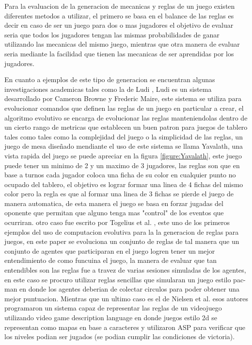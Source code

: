 Para la evaluacion de la generacion de mecanicas y reglas de un juego existen
diferentes metodos a utilizar, el primero se basa en el balance de las reglas es
decir en caso de ser un juego para dos o mas jugadores el objetivo de evaluar
seria que todos los jugadores tengan las mismas probabilidades de ganar
utilizando las mecanicas del mismo juego, mientras que otra manera de evaluar
seria mediante la facilidad que tienen las mecanicas de ser aprendidas por los
jugadores.

En cuanto a ejemplos de este tipo de generacion se encuentran algunas
investigaciones academicas tales como la de Ludi \cite{Browne2010}, Ludi es un
sistema desarrollado por Cameron Browne y Frederic Maire, este sistema se
utiliza para evolucionar comandos que definen las reglas de un juego en
particular a crear, el algoritmo evolutivo se encarga de evolucionar las reglas
manteniendolas dentro de un cierto rango de metricas que establecen un buen
patron para juegos de tablero tales como tales como la complejidad del juego o
la simplicidad de las reglas, un juego de mesa diseñado mendiante el uso de este
sistema se llama Yavalath, una vista rapida del juego se puede apreciar en la
figura \ref{figure:Yavalath}, este juego puede tener un minimo de 2 y un maximo
de 3 jugadores, las reglas son que en base a turnos cada jugador coloca una
ficha de su color en cualquier punto no ocupado del tablero, el objetivo es
lograr formar una linea de 4 fichas del mismo color pero la regla es que al
formar una linea de 3 fichas se pierde el juego de manera automatica, de esta
manera el juego se basa en forzar jugadas del oponente que permitan que alguno
tenga mas "control" de los eventos que ocurriran. otro caso fue escrito por
Togelius et al. \cite{Togelius2008}, este uno de los primeros ejemplos del uso
de computacion evolutiva para la la generacion de reglas para juegos, en este
paper se evoluciona un conjunto de reglas de tal manera que un conjunto de
agentes que participaran en el juego logren tener un mejor entendimiento de como
funcuina el juego, la manera de evaluar que tan entendibles son las reglas fue a
travez de varias sesiones simuladas de los agentes, en este caso se procuro
utilizar reglas sencillas que simularan un juego estilo pac-man en donde los
agentes deberian de colectar circulos para poder obtener una mejor puntuacion.
Mientras que un ultimo caso es el de Nielsen et al. \cite{Nielsen2015} esos
autores programaron un sistema capaz de representar las reglas de un videojuego
utilizando video game description language en donde juegos estilo 2d se
representan como mapas en base a caracteres y utilizaron ASP para verificar que
los niveles podian ser jugados (se podian cumplir las condiciones de victoria).

